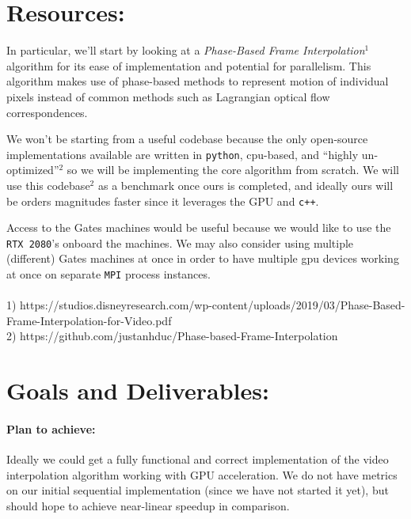 \documentclass[12pt]{article}
\begin{document}
\section*{Resources:}
\par In particular, we'll start by looking at a \textit{Phase-Based Frame Interpolation}$^1$ algorithm for its ease of implementation and potential for parallelism. This algorithm makes use of phase-based methods to represent motion of individual pixels instead of common methods such as Lagrangian optical flow correspondences.
\par We won't be starting from a useful codebase because the only open-source implementations available are written in \texttt{python}, cpu-based, and ``highly un-optimized''$^2$ so we will be implementing the core algorithm from scratch. We will use this codebase$^2$ as a benchmark once ours is completed, and ideally ours will be orders magnitudes faster since it leverages the GPU and \texttt{c++}.
\par Access to the Gates machines would be useful because we would like to use the \texttt{RTX 2080}'s onboard the machines. We may also consider using multiple (different) Gates machines at once in order to have multiple gpu devices working at once on separate \texttt{MPI} process instances. 
$~$\\\\
1) https://studios.disneyresearch.com/wp-content/uploads/2019/03/Phase-Based-Frame-Interpolation-for-Video.pdf\\
2) https://github.com/justanhduc/Phase-based-Frame-Interpolation

\section*{Goals and Deliverables:}
\paragraph{Plan to achieve:}
\par Ideally we could get a fully functional and correct implementation of the video interpolation algorithm working with GPU acceleration. We do not have metrics on our initial sequential implementation (since we have not started it yet), but should hope to achieve near-linear speedup in comparison. 
\end{document}
